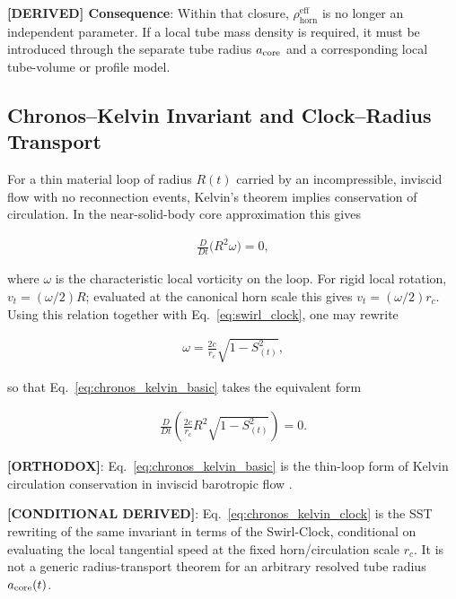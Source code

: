 \documentclass[11pt]{article}
\theoremstyle{definition}
\theoremstyle{plain}
\theoremstyle{remark}
\newcommand{\rhohorn}{\rho_{\mathrm{horn}}^{\mathrm{eff}}}
\newcommand{\rc}{{r_c}}
\begin{document}
        \textbf{[DERIVED] Consequence}: Within that closure, $\rhohorn$ is no
        longer an independent parameter. If a local tube mass density is required,
        it must be introduced through the separate tube radius $a_{\rm core}$ and
        a corresponding local tube-volume or profile model.


    \subsection{Chronos--Kelvin Invariant and Clock--Radius Transport}
        \label{subsec:chronos_kelvin}

        For a thin material loop of radius $R(t)$ carried by an incompressible, inviscid flow with no reconnection events, Kelvin's theorem implies conservation of circulation. In the near-solid-body core approximation this gives

        \begin{align}
            \frac{D}{Dt}\!\bigl(R^2 \omega\bigr) = 0,
            \label{eq:chronos_kelvin_basic}
        \end{align}

        where $\omega$ is the characteristic local vorticity on the loop. For rigid local rotation, $v_t=(\omega/2)R$; evaluated at the canonical horn scale this gives $v_t=(\omega/2)\rc$. Using this relation together with Eq.~\eqref{eq:swirl_clock}, one may rewrite

        \begin{align}
            \omega = \frac{2c}{\rc}\sqrt{1-S_{(t)}^2},
        \end{align}

        so that Eq.~\eqref{eq:chronos_kelvin_basic} takes the equivalent form

        \begin{align}
            \frac{D}{Dt}\left(\frac{2c}{\rc} R^2 \sqrt{1-S_{(t)}^2}\right) = 0.
            \label{eq:chronos_kelvin_clock}
        \end{align}

        \textbf{[ORTHODOX]}: Eq.~\eqref{eq:chronos_kelvin_basic} is the thin-loop form of Kelvin circulation conservation in inviscid barotropic flow \cite{Batchelor1967,Saffman1992}.

        \textbf{[CONDITIONAL DERIVED]}: Eq.~\eqref{eq:chronos_kelvin_clock} is the SST rewriting of the same invariant in terms of the Swirl-Clock, conditional on evaluating the local tangential speed at the fixed horn/circulation scale $\rc$. It is not a generic radius-transport theorem for an arbitrary resolved tube radius $a_{\rm core}(t)$.
\end{document}
